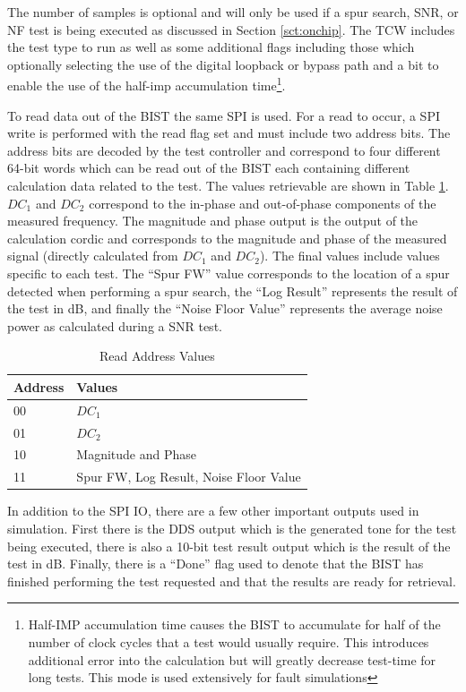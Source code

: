 \documentclass[12pt]{report}
\begin{document}
The number of samples is optional and will only be used if a spur search, SNR, or NF test is being executed as discussed in Section \ref{sct:onchip}.  The TCW includes the test type to run as well as some additional flags including those which optionally selecting the use of the digital loopback or bypass path and a bit to enable the use of the half-imp accumulation time\footnote{Half-IMP accumulation time causes the BIST to accumulate for half of the number of clock cycles that a test would usually require.  This introduces additional error into the calculation but will greatly decrease test-time for long tests.  This mode is used extensively for fault simulations}.  

To read data out of the BIST the same SPI is used.  For a read to occur, a SPI write is performed with the read flag set and must include two address bits.  The address bits are decoded by the test controller and correspond to four different 64-bit words which can be read out of the BIST each containing different calculation data related to the test.  The values retrievable are shown in Table \ref{tbl:readvals}.  $DC_1$ and $DC_2$ correspond to the in-phase and out-of-phase components of the measured frequency.  The magnitude and phase output is the output of the calculation cordic and corresponds to the magnitude and phase of the measured signal (directly calculated from $DC_1$ and $DC_2$).  The final values include values specific to each test.  The ``Spur FW'' value corresponds to the location of a spur detected when performing a spur search, the ``Log Result'' represents the result of the test in dB, and finally the ``Noise Floor Value'' represents the average noise power as calculated during a SNR test.
\begin{table}
	\caption{Read Address Values}
	\begin{center}
		\begin{tabular}{|l|l|}
			\hline
			Address & Values \\ \hline
			00 & $DC_1$ \\ \hline
			01 & $DC_2$ \\ \hline
			10 & Magnitude and Phase \\ \hline
			11 & Spur FW, Log Result, Noise Floor Value \\ \hline			
		\end{tabular}
	\end{center}
	\label{tbl:readvals}
\end{table}

In addition to the SPI IO, there are a few other important outputs used in simulation.  First there is the DDS output which is the generated tone for the test being executed, there is also a 10-bit test result output which is the result of the test in dB.  Finally, there is a ``Done'' flag used to denote that the BIST has finished performing the test requested and that the results are ready for retrieval.
\end{document}
